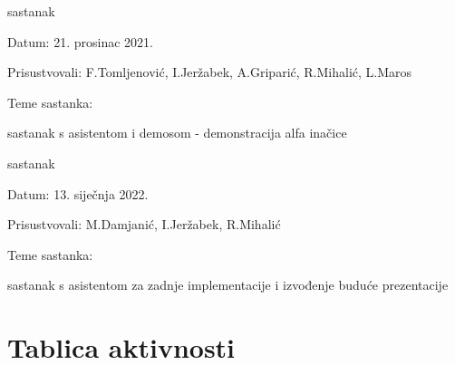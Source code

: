 \begin{packed_enum}
			\item  sastanak
			\item[] \begin{packed_item}
				\item Datum: 21. prosinac 2021. 
				\item Prisustvovali: F.Tomljenović, I.Jeržabek, A.Griparić, R.Mihalić, L.Maros
				\item Teme sastanka:
				\begin{packed_item}
					\item   sastanak s asistentom i demosom - demonstracija alfa inačice
				\end{packed_item}
			\end{packed_item}
		
			\item  sastanak
			\item[] \begin{packed_item}
				\item Datum: 13. siječnja 2022. 
				\item Prisustvovali: M.Damjanić, I.Jeržabek, R.Mihalić
				\item Teme sastanka:
				\begin{packed_item}
					\item  sastanak s asistentom za zadnje implementacije i izvođenje buduće prezentacije
				\end{packed_item}
			\end{packed_item}			
			
		\end{packed_enum}
		
		\eject
		\section*{Tablica aktivnosti}
		
			

